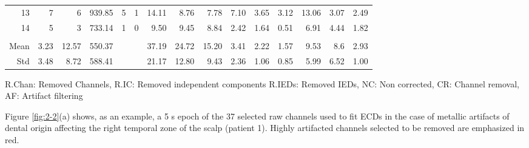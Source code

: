 \begin{table}[!h]
\begin{threeparttable}
\begin{tabular}{rrrrrrrrrrrrrrr}
13    & 7                                                  & 6     & 939.85  & 5                                 & 1                                 & 14.11                     & 8.76                     & 7.78                     & 7.10     & 3.65     & 3.12     & 13.06    & 3.07     & 2.49   \\
14    & 5                                                  & 3     & 733.14  & 1                                 & 0                                 & 9.50                      & 9.45                     & 8.84                     & 2.42     & 1.64     & 0.51     & 6.91     & 4.44     & 1.82   \\
      &                                                    &       &         &                                   &                                   &                           &                          &                          &          &          &          &          &          &        \\
Mean  & 3.23                                               & 12.57 & 550.37  &                                   &                                   & 37.19                     & 24.72                    & 15.20                    & 3.41     & 2.22     & 1.57     & 9.53     & 8.6      & 2.93   \\
Std   & 3.48                                               & 8.72  & 588.41  &                                   &                                   & 21.17                     & 12.80                    & 9.43                     & 2.36     & 1.06     & 0.85     & 5.99     & 6.52     & 1.00  
\end{tabular}
\begin{tablenotes}
      \small
      \item \begin{flushright} R.Chan: Removed Channels, R.IC: Removed independent components R.IEDs: Removed IEDs, NC: Non corrected, CR: Channel removal, AF: Artifact filtering
     \end{flushright}
    \end{tablenotes}
    \end{threeparttable}
\end{table}


Figure \ref{fig:2-2}(a) shows, as an example, a 5 s epoch of the 37 selected raw channels used to fit ECDs in the case of metallic artifacts of dental origin affecting the right temporal zone of the scalp (patient 1). Highly artifacted channels selected to be removed are emphasized in red.

